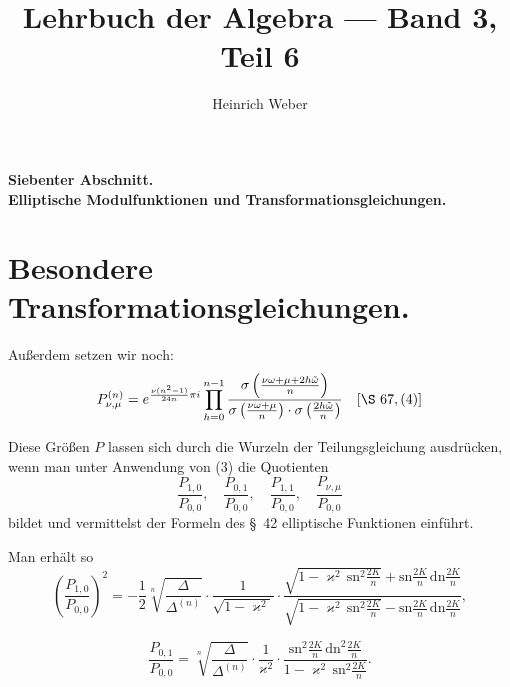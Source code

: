 \documentclass[12pt,a4paper]{article}
\title{Lehrbuch der Algebra --- Band 3, Teil 6}
\author{Heinrich Weber}
\date{}
\theoremstyle{definition}
\begin{document}
\maketitle
\thispagestyle{empty}

\vspace{1cm}
\begin{center}
\Large\textbf{Siebenter Abschnitt.}\\[0.5em]
\large\textbf{Elliptische Modulfunktionen und Transformationsgleichungen.}
\end{center}

\vspace{1cm}

\setcounter{section}{66}



\section{Besondere Transformationsgleichungen.}\label{sec:67}

Außerdem setzen wir noch:
\begin{equation}\label{eq:67-4}
P_{\nu,\mu}^{(n)} = e^{\frac{\nu(n^2-1)}{24n}\pi i} \prod_{h=0}^{n-1} \frac{\sigma\left(\frac{\nu\omega + \mu + 2h\tilde{\omega}}{n}\right)}{\sigma\left(\frac{\nu\omega + \mu}{n}\right) \cdot \sigma\left(\frac{2h\tilde{\omega}}{n}\right)} \quad [\S\ 67, (4)]
\end{equation}

Diese Größen $P$ lassen sich durch die Wurzeln der Teilungsgleichung ausdrücken, wenn man unter Anwendung von (3) die Quotienten
\[
\frac{P_{1,0}}{P_{0,0}}, \quad \frac{P_{0,1}}{P_{0,0}}, \quad \frac{P_{1,1}}{P_{0,0}}, \quad \frac{P_{\nu,\mu}}{P_{0,0}}
\]
bildet und vermittelst der Formeln des \S\ 42 elliptische Funktionen einführt.

Man erhält so
\begin{equation}\label{eq:67-5}
\left(\frac{P_{1,0}}{P_{0,0}}\right)^2 = -\frac{1}{2}\sqrt[n]{\frac{\Delta}{\Delta^{(n)}}} \cdot \frac{1}{\sqrt{1-\varkappa^2}} \cdot \frac{\sqrt{1-\varkappa^2\,\mathrm{sn}^2\frac{2K}{n}} + \mathrm{sn}\frac{2K}{n}\,\mathrm{dn}\frac{2K}{n}}{\sqrt{1-\varkappa^2\,\mathrm{sn}^2\frac{2K}{n}} - \mathrm{sn}\frac{2K}{n}\,\mathrm{dn}\frac{2K}{n}},
\end{equation}

\begin{equation}\label{eq:67-6}
\frac{P_{0,1}}{P_{0,0}} = \sqrt[n]{\frac{\Delta}{\Delta^{(n)}}} \cdot \frac{1}{\varkappa^2} \cdot \frac{\mathrm{sn}^2\frac{2K}{n}\,\mathrm{dn}^2\frac{2K}{n}}{1-\varkappa^2\,\mathrm{sn}^2\frac{2K}{n}}.
\end{equation}
\end{document}
